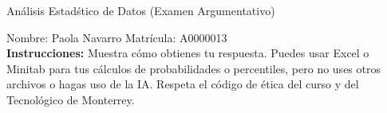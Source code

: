 \documentclass[8pt]{report}
\begin{document}
\newpage



\begin{center}
{An\'alisis Estad\'stico de Datos (Examen Argumentativo)}
\end{center}

Nombre: \underline{\hspace*{.2in}}
Paola Navarro
\underline{\hspace*{.2in}} \quad Matr\'icula:\underline{\hspace*{.2in}}
A0000013
\underline{\hspace*{.2in}} \\

{\bf Instrucciones:} Muestra c\'omo obtienes tu respuesta. Puedes usar Excel 
o Minitab para tus cálculos de probabilidades o 
percentiles, pero no uses otros archivos o hagas uso de la IA. Respeta el 
c\'odigo de \'etica del curso y del Tecnol\'ogico 
de Monterrey.
\end{document}
